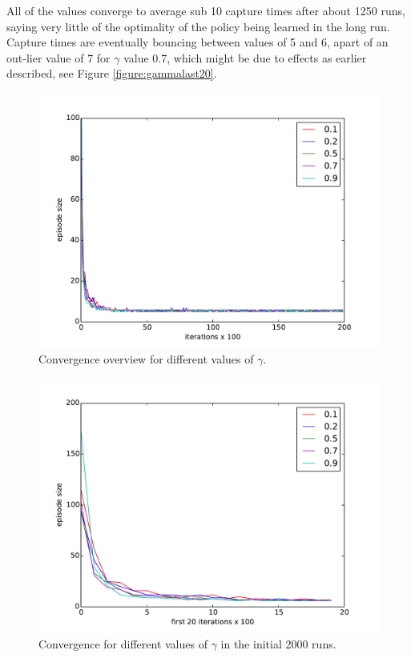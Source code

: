 \documentclass[paper=a4, fontsize=11pt]{scrartcl}
\numberwithin{equation}{section}		%
\numberwithin{figure}{section}			%
\numberwithin{table}{section}				%
\begin{document}
All of the values converge to average sub 10 capture times after about 1250 runs, saying very little of the optimality of the policy being learned in the long run. Capture times are eventually bouncing between values of 5 and 6, apart of an out-lier value of 7 for $\gamma$ value 0.7, which might be due to effects as earlier described, see Figure \ref{figure:gammalast20}.
\begin{figure}[H] \centering
\includegraphics[scale=0.5]{gammaOverview.pdf}
\caption{Convergence overview for different values of $\gamma$.} 
\label{figure:gammaOverview}
\end{figure}
\begin{figure}[H] \centering
\includegraphics[scale=0.5]{gammafirst20x100.pdf}
\caption{Convergence for different values of $\gamma$ in the initial 2000 runs.} 
\label{figure:gammafirst20}
\end{figure}
\end{document}
